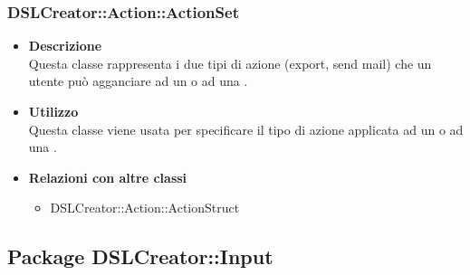  \subsubsection{DSLCreator::Action::ActionSet}
                    \begin{itemize}
                        \item \textbf{Descrizione} \hfill \\
                          Questa classe rappresenta i due tipi di azione (export, send mail) che un utente può agganciare ad un  o ad una .
                        \item \textbf{Utilizzo} \hfill \\
                          Questa classe viene usata per specificare il tipo di azione applicata ad un  o ad una .
                        \item \textbf{Relazioni con altre classi}
                            \begin{itemize}
                              \item DSLCreator::Action::ActionStruct
                            \end{itemize}
                    \end{itemize}  

\subsection{Package DSLCreator::Input}
